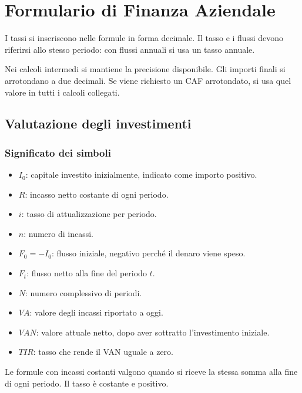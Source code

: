 
\begingroup
\setlength{\parindent}{0pt}
\setlength{\parskip}{0pt}

\section{Formulario di Finanza Aziendale}

\noindent
I tassi si inseriscono nelle formule in forma decimale.
Il tasso e i flussi devono riferirsi allo stesso periodo:
con flussi annuali si usa un tasso annuale.

\noindent
Nei calcoli intermedi si mantiene la precisione disponibile.
Gli importi finali si arrotondano a due decimali.
Se viene richiesto un CAF arrotondato, si usa quel valore
in tutti i calcoli collegati.

\subsection{Valutazione degli investimenti}

\subsubsection*{Significato dei simboli}

\begin{itemize}
    \item $I_0$: capitale investito inizialmente, indicato
        come importo positivo.
    \item $R$: incasso netto costante di ogni periodo.
    \item $i$: tasso di attualizzazione per periodo.
    \item $n$: numero di incassi.
    \item $F_0=-I_0$: flusso iniziale, negativo perché
        il denaro viene speso.
    \item $F_t$: flusso netto alla fine del periodo $t$.
    \item $N$: numero complessivo di periodi.
    \item $VA$: valore degli incassi riportato a oggi.
    \item $VAN$: valore attuale netto, dopo aver sottratto
        l'investimento iniziale.
    \item $TIR$: tasso che rende il VAN uguale a zero.
\end{itemize}

\noindent
Le formule con incassi costanti valgono quando si riceve
la stessa somma alla fine di ogni periodo.
Il tasso è costante e positivo.

